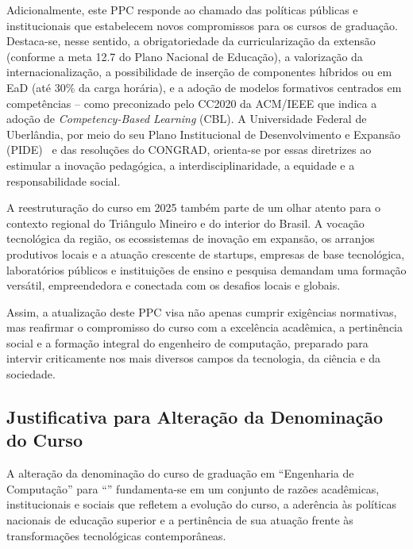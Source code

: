 Adicionalmente, este PPC responde ao chamado das políticas públicas e institucionais que estabelecem novos compromissos para os cursos de graduação. Destaca-se, nesse sentido, a obrigatoriedade da curricularização da extensão (conforme a meta 12.7 do Plano Nacional de Educação), a valorização da internacionalização, a possibilidade de inserção de componentes híbridos ou em EaD (até 30\% da carga horária), e a adoção de modelos formativos centrados em competências -- como preconizado pelo CC2020 da ACM/IEEE que indica a adoção de \textit{Competency-Based Learning} (CBL). A Universidade Federal de Uberlândia, por meio do seu Plano Institucional de Desenvolvimento e Expansão (PIDE)~\cite{UFU:CONSUN:31:2022} e das resoluções do CONGRAD, orienta-se por essas diretrizes ao estimular a inovação pedagógica, a interdisciplinaridade, a equidade e a responsabilidade social.

A reestruturação do curso em 2025 também parte de um olhar atento para o contexto regional do Triângulo Mineiro e do interior do Brasil. A vocação tecnológica da região, os ecossistemas de inovação em expansão, os arranjos produtivos locais e a atuação crescente de startups, empresas de base tecnológica, laboratórios públicos e instituições de ensino e pesquisa demandam uma formação versátil, empreendedora e conectada com os desafios locais e globais.

Assim, a atualização deste PPC visa não apenas cumprir exigências normativas, mas reafirmar o compromisso do curso com a excelência acadêmica, a pertinência social e a formação integral do engenheiro de computação, preparado para intervir criticamente nos mais diversos campos da tecnologia, da ciência e da sociedade.

\subsection{Justificativa para Alteração da Denominação do Curso}

A alteração da denominação do curso de graduação em ``Engenharia de Computação'' para ``\nomecursonovo'' fundamenta-se em um conjunto de razões acadêmicas, institucionais e sociais que refletem a evolução do curso, a aderência às políticas nacionais de educação superior e a pertinência de sua atuação frente às transformações tecnológicas contemporâneas.



